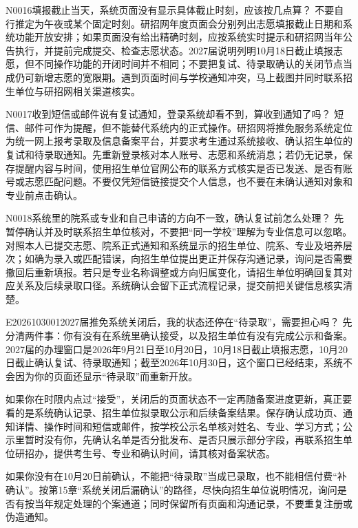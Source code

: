 \begin{qa}{N0016}{填报截止当天，系统页面没有显示具体截止时刻，应该按几点算？}
不要自行推定为午夜或某个固定时刻。研招网年度页面会分别列出志愿填报截止日期和系统功能开放安排；如果页面没有给出精确时刻，应按系统实时提示和研招网当年公告执行，并提前完成提交、检查志愿状态。2027届说明列明10月18日截止填报志愿，但不同操作功能的开闭时间并不相同；不要把复试、待录取确认的关闭节点当成仍可新增志愿的宽限期。遇到页面时间与学校通知冲突，马上截图并同时联系招生单位与研招网相关渠道核实。
\end{qa}

\begin{qa}{N0017}{收到短信或邮件说有复试通知，登录系统却看不到，算收到通知了吗？}
短信、邮件可作为提醒，但不能替代系统内的正式操作。研招网将推免服务系统定位为统一网上报考录取及信息备案平台，并要求考生通过系统接收、确认招生单位的复试和待录取通知。先重新登录核对本人账号、志愿和系统消息；若仍无记录，保存提醒内容与时间，使用招生单位官网公布的联系方式核实是否已发送、是否有账号或志愿匹配问题。不要仅凭短信链接提交个人信息，也不要在未确认通知对象和专业前点击确认。
\end{qa}

\begin{qa}{N0018}{系统里的院系或专业和自己申请的方向不一致，确认复试前怎么处理？}
先暂停确认并及时联系招生单位核对，不要把“同一学校”理解为专业信息可以忽略。对照本人已提交志愿、院系正式通知和系统显示的招生单位、院系、专业及培养层次；如确为录入或匹配错误，向招生单位提出更正并保存沟通记录，询问是否需要撤回后重新填报。若只是专业名称调整或方向归属变化，请招生单位明确回复其对应关系及后续录取口径。系统确认会留下正式流程记录，提交前把关键信息核实清楚。
\end{qa}

\begin{qa}{E2026103001}{2027届推免系统关闭后，我的状态还停在“待录取”，需要担心吗？}
先分清两件事：你有没有在系统里确认接受，以及招生单位有没有完成公示和备案。2027届的办理窗口是2026年9月21日至10月20日，10月18日截止填报志愿，10月20日截止确认复试、待录取通知；截至2026年10月30日，这个窗口已经结束，系统不会因为你的页面还显示“待录取”而重新开放。

如果你在时限内点过“接受”，关闭后的页面状态不一定再随备案进度更新，真正要看的是系统确认记录、招生单位拟录取公示和后续备案结果。保存确认成功页、通知详情、操作时间和短信或邮件，按学校公示名单核对姓名、专业、学习方式；公示里暂时没有你，先确认名单是否分批发布、是否只展示部分字段，再联系招生单位研招办，提供考生号、专业和确认时间，请其核对备案状态。

如果你没有在10月20日前确认，不能把“待录取”当成已录取，也不能相信付费“补确认”。按第15章“系统关闭后漏确认”的路径，尽快向招生单位说明情况，询问是否有按当年规定处理的个案通道；同时保留所有页面和沟通记录，不要重复注册或伪造通知。
\end{qa}

